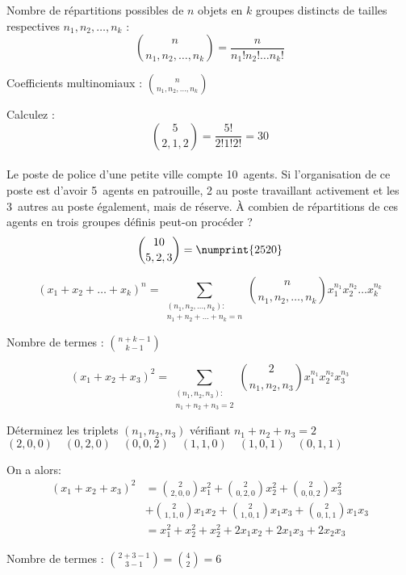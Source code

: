 Nombre de répartitions possibles de $n$ objets en $k$ groupes distincts de tailles respectives $n_1, n_2,\dots, n_k$ :
\[\binom{n}{n_1,n_2,\dots,n_k} = \frac{n}{n_1!n_2!\dots n_k!}\]

Coefficients multinomiaux : $\binom{n}{n_1,n_2,\dots,n_k}$

 Calculez :
\[\binom{5}{2,1,2} = \frac{5!}{2!1!2!} = 30\]
\\Le poste de police d’une petite ville compte 10~agents. Si l’organisation de ce poste est d’avoir 5~agents en patrouille, 2 au poste travaillant activement et les 3~autres au poste également, mais de réserve. À combien de répartitions de ces agents en trois groupes définis peut-on procéder ?
\[\binom{10}{5,2,3} = \numprint{2520}\]

\[(x_1 + x_2 + \dots + x_k)^n = \sum_{\substack{(n_1,n_2,\dots,n_k):\\n_1+n_2+\dots+n_k=n}} \binom{n}{n_1,n_2,\dots,n_k} x_1^{n_1} x_2^{n_2} \dots x_k^{n_k}\]

Nombre de termes : $\binom{n+k-1}{k-1}$

\[(x_1 + x_2 + x_3)^2 = \sum_{\substack{(n_1,n_2,n_3):\\n_1+n_2+n_3=2}} \binom{2}{n_1,n_2,n_3} x_1^{n_1} x_2^{n_2} x_3^{n_3}\]

\noindent Déterminez les triplets $(n_1, n_2, n_3)$ vérifiant $n_1 + n_2 + n_3 = 2$
$(2,0,0) \quad (0,2,0) \quad (0,0,2) \quad
 (1,1,0) \quad (1,0,1) \quad (0,1,1)$

\noindent On a alors:
\begin{align*}
	(x_1 + x_2 + x_3)^2 & = \binom{2}{2,0,0}x_1^2 + \binom{2}{0,2,0}x_2^2 + \binom{2}{0,0,2}x_3^2       \\
	                    & + \binom{2}{1,1,0}x_1 x_2 + \binom{2}{1,0,1}x_1 x_3 + \binom{2}{0,1,1}x_1 x_3 \\
	                    & = x_1^2 + x_2^2 + x_2^2 + 2 x_1 x_2 + 2 x_1 x_3 + 2 x_2 x_3
\end{align*}

Nombre de termes : $\binom{2+3-1}{3-1} = \binom{4}{2} = 6$